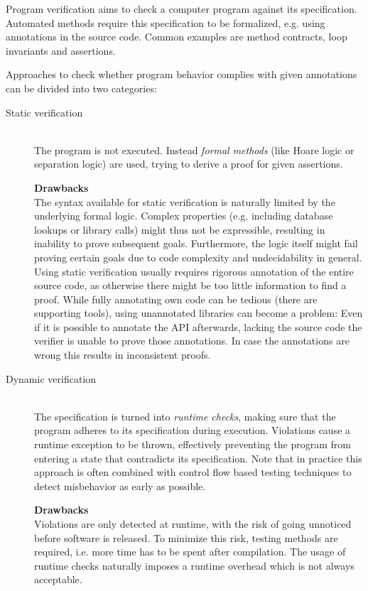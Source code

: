 Program verification aims to check a computer program against its specification.
Automated methods require this specification to be formalized, e.g. using annotations in the source code.
Common examples are method contracts, loop invariants and assertions.

Approaches to check whether program behavior complies with given annotations can be divided into two categories:
\begin{description}
    \item[Static verification]~\\
        The program is not executed. 
        Instead \emph{formal methods} (like Hoare logic or separation logic) are used, trying to derive a proof for given assertions.
        
        \textbf{Drawbacks}\\
        The syntax available for static verification is naturally limited by the underlying formal logic.
        Complex properties (e.g. including database lookups or library calls) might thus not be expressible, resulting in inability to prove subsequent goals.
        Furthermore, the logic itself might fail proving certain goals due to code complexity and undecidability in general.
        Using static verification usually requires rigorous annotation of the entire source code, as otherwise there might be too little information to find a proof.
        While fully annotating own code can be tedious (there are supporting tools), using unannotated libraries can become a problem:
        Even if it is possible to annotate the API afterwards, lacking the source code the verifier is unable to prove those annotations.
        In case the annotations are wrong this results in inconsistent proofs.
        
    \item[Dynamic verification]~\\
        The specification is turned into \emph{runtime checks}, making sure that the program adheres to its specification during execution.
        Violations cause a runtime exception to be thrown, effectively preventing the program from entering a state that contradicts its specification.
        Note that in practice this approach is often combined with control flow based testing techniques to detect misbehavior as early as possible.
        
        \textbf{Drawbacks}\\
        Violations are only detected at runtime, with the risk of going unnoticed before software is released.
        To minimize this risk, testing methods are required, i.e. more time has to be spent after compilation.
        The usage of runtime checks naturally imposes a runtime overhead which is not always acceptable.
\end{description}

